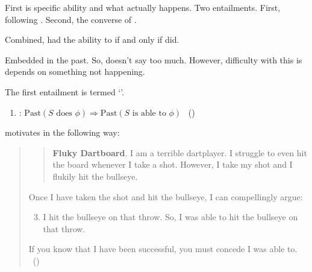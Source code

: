 \begin{note}
  First is specific ability and what actually happens.
  Two entailments.
  First, \BoyPS{} following \textcite{Boylan:2020aa}.
  Second, \BoyPSC{} the converse of \BoyPS{}.

  Combined, had the ability to if and only if did.

  Embedded in the past.
  So, doesn't say too much.
  However, difficulty with this is \fc{} depends on something not happening.
\end{note}

\begin{note}
  The first entailment is termed `\BoyPS{}'.

  \begin{enumerate}[label=]
  \item
    \label{Boylan:Past-Success}
    \BoyPS{}: \(\text{Past}(S\text{ does }\phi) \Rightarrow \text{Past}(S\text{ is able to }\phi)\)%
    \mbox{ }\hfill\mbox{(\citeyear[\S1.1]{Boylan:2020aa})}
  \end{enumerate}

  \citeauthor{Boylan:2020aa} motivates \BoyPS{} in the following way:
  \begin{quote}
    \begin{quote}
      \textbf{Fluky Dartboard}.
      I am a terrible dartplayer.
      I struggle to even hit the board whenever I take a shot.
      However, I take my shot and I flukily hit the bullseye.
    \end{quote}

    Once I have taken the shot and hit the bullseye, I can compellingly argue:

    \begin{enumerate}
      \setcounter{enumi}{2}
    \item
      I hit the bullseye on that throw.\newline
      So, I was able to hit the bullseye on that throw.
    \end{enumerate}

    If you know that I have been successful, you must concede I was able to.%
    \mbox{ }\hfill\mbox{(\citeyear[2]{Boylan:2020aa})}
  \end{quote}


\end{note}
